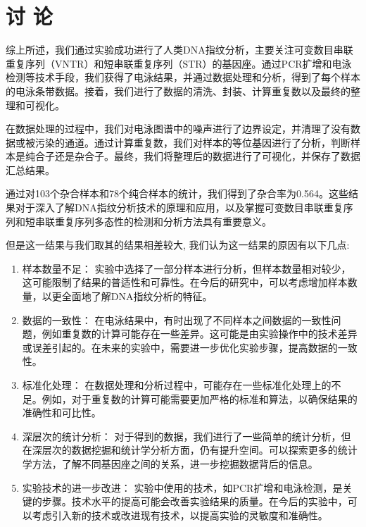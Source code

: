 \documentclass[AutoFakeBold]{LZUThesis}
\begin{document}
\chapter{\texorpdfstring{讨 \quad 论}{讨论}}

综上所述，我们通过实验成功进行了人类DNA指纹分析，主要关注可变数目串联重复序列（VNTR）和短串联重复序列（STR）的基因座。通过PCR扩增和电泳检测等技术手段，我们获得了电泳结果，并通过数据处理和分析，得到了每个样本的电泳条带数据。接着，我们进行了数据的清洗、封装、计算重复数以及最终的整理和可视化。

在数据处理的过程中，我们对电泳图谱中的噪声进行了边界设定，并清理了没有数据或被污染的通道。通过计算重复数，我们对样本的等位基因进行了分析，判断样本是纯合子还是杂合子。最终，我们将整理后的数据进行了可视化，并保存了数据汇总结果。

通过对103个杂合样本和78个纯合样本的统计，我们得到了杂合率为0.564。这些结果对于深入了解DNA指纹分析技术的原理和应用，以及掌握可变数目串联重复序列和短串联重复序列多态性的检测和分析方法具有重要意义。

但是这一结果与我们取其的结果相差较大,
我们认为这一结果的原因有以下几点:

\begin{enumerate}
\item 样本数量不足： 实验中选择了一部分样本进行分析，但样本数量相对较少，这可能限制了结果的普适性和可靠性。在今后的研究中，可以考虑增加样本数量，以更全面地了解DNA指纹分析的特征。

\item 数据的一致性： 在电泳结果中，有时出现了不同样本之间数据的一致性问题，例如重复数的计算可能存在一些差异。这可能是由实验操作中的技术差异或误差引起的。在未来的实验中，需要进一步优化实验步骤，提高数据的一致性。

\item 标准化处理： 在数据处理和分析过程中，可能存在一些标准化处理上的不足。例如，对于重复数的计算可能需要更加严格的标准和算法，以确保结果的准确性和可比性。

\item 深层次的统计分析： 对于得到的数据，我们进行了一些简单的统计分析，但在深层次的数据挖掘和统计学分析方面，仍有提升空间。可以探索更多的统计学方法，了解不同基因座之间的关系，进一步挖掘数据背后的信息。

\item 实验技术的进一步改进： 实验中使用的技术，如PCR扩增和电泳检测，是关键的步骤。技术水平的提高可能会改善实验结果的质量。在今后的实验中，可以考虑引入新的技术或改进现有技术，以提高实验的灵敏度和准确性。
\end{enumerate}
\end{document}
